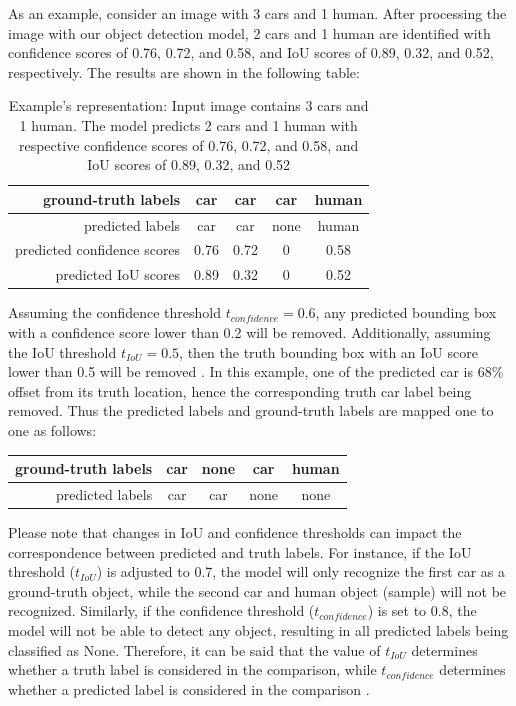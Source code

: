 As an example, consider an image with 3 cars and 1 human. After processing the image with our object detection model, 2 cars and 1 human are identified with confidence scores of 0.76, 0.72, and 0.58, and IoU scores of 0.89, 0.32, and 0.52, respectively. The results are shown in the following table:
\begin{table}[H]
    \centering
    \begin{tabular}{rcccc}
        ground-truth labels         & car  & car  & car  & human \\ \hline
        predicted labels            & car  & car  & none & human \\ \hline
        predicted confidence scores & 0.76 & 0.72 & 0    & 0.58  \\ \hline
        predicted IoU scores        & 0.89 & 0.32 & 0    & 0.52 
    \end{tabular}
    \caption{Example's representation: Input image contains 3 cars and 1 human. The model predicts 2 cars and 1 human with respective confidence scores of 0.76, 0.72, and 0.58, and IoU scores of 0.89, 0.32, and 0.52} \label{ex:truth_pred_score_map}
\end{table}

Assuming the confidence threshold $t_{confidence}=0.6$, any predicted bounding box with a confidence score lower than 0.2 will be removed. Additionally, assuming the IoU threshold $t_{IoU}=0.5$, then the truth bounding box with an IoU score lower than 0.5 will be removed \cite{metrics_survey_2020}. In this example, one of the predicted car is 68\% offset from its truth location, hence the corresponding truth car label being removed. Thus the predicted labels and ground-truth labels are mapped one to one as follows:
\begin{table}[H]
    \centering
    \begin{tabular}{rcccc}
    ground-truth labels         & car  & none & car  & human \\ \hline
    predicted labels            & car  & car  & none & none
    \end{tabular}
\end{table}

\noindent Please note that changes in IoU and confidence thresholds can impact the correspondence between predicted and truth labels. For instance, if the IoU threshold ($t_{IoU}$) is adjusted to 0.7, the model will only recognize the first car as a ground-truth object, while the second car and human object (sample) will not be recognized. Similarly, if the confidence threshold ($t_{confidence}$) is set to 0.8, the model will not be able to detect any object, resulting in all predicted labels being classified as None. Therefore, it can be said that the value of $t_{IoU}$ determines whether a truth label is considered in the comparison, while $t_{confidence}$ determines whether a predicted label is considered in the comparison \cite{metrics_survey_2020}.

